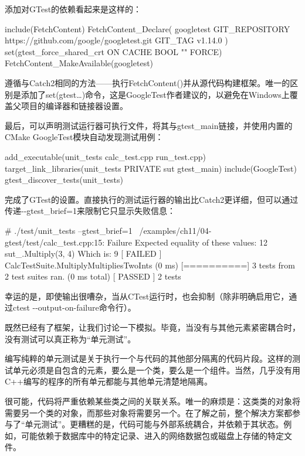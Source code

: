 添加对GTest的依赖看起来是这样的：


\begin{cmake}
include(FetchContent)
FetchContent_Declare(
    googletest
    GIT_REPOSITORY https://github.com/google/googletest.git
    GIT_TAG v1.14.0
)
set(gtest_force_shared_crt ON CACHE BOOL "" FORCE)
FetchContent_MakeAvailable(googletest)
\end{cmake}

遵循与Catch2相同的方法——执行FetchContent()并从源代码构建框架。唯一的区别是添加了set(gtest…)命令，这是GoogleTest作者建议的，以避免在Windows上覆盖父项目的编译器和链接器设置。

最后，可以声明测试运行器可执行文件，将其与gtest\_main链接，并使用内置的CMake GoogleTest模块自动发现测试用例：


\begin{cmake}
add_executable(unit_tests
               calc_test.cpp
               run_test.cpp)
target_link_libraries(unit_tests PRIVATE sut gtest_main)
include(GoogleTest)
gtest_discover_tests(unit_tests)
\end{cmake}

完成了GTest的设置。直接执行的测试运行器的输出比Catch2更详细，但可以通过传递-{}-gtest\_brief=1来限制它只显示失败信息：

\begin{shell}
# ./test/unit_tests --gtest_brief=1
~/examples/ch11/04-gtest/test/calc_test.cpp:15: Failure
Expected equality of these values:
  12
  sut_.Multiply(3, 4)
    Which is: 9
[ FAILED ] CalcTestSuite.MultiplyMultipliesTwoInts (0 ms)
[==========] 3 tests from 2 test suites ran. (0 ms total)
[ PASSED ] 2 tests
\end{shell}

幸运的是，即使输出很嘈杂，当从CTest运行时，也会抑制（除非明确启用它，通过ctest -{}-output-on-failure命令行）。

既然已经有了框架，让我们讨论一下模拟。毕竟，当没有与其他元素紧密耦合时，没有测试可以真正称为“单元测试”。


编写纯粹的单元测试是关于执行一个与代码的其他部分隔离的代码片段。这样的测试单元必须是自包含的元素，要么是一个类，要么是一个组件。当然，几乎没有用C++编写的程序的所有单元都能与其他单元清楚地隔离。

很可能，代码将严重依赖某些类之间的关联关系。唯一的麻烦是：这类类的对象将需要另一个类的对象，而那些对象将需要另一个。在了解之前，整个解决方案都参与了“单元测试”。更糟糕的是，代码可能与外部系统耦合，并依赖于其状态。例如，可能依赖于数据库中的特定记录、进入的网络数据包或磁盘上存储的特定文件。

